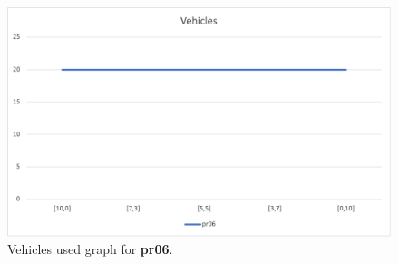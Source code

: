 \begin{figure}[H]
    \centering
    \includegraphics[height=0.25\textheight]{../graphs/pr06-vehicles.png}
    \caption{Vehicles used graph for \textbf{pr06}.}
\end{figure}

\newpage
